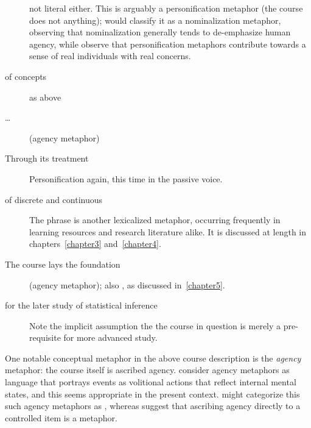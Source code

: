 \begin{description}
  not literal either.  This is arguably a personification metaphor
  (the course does not  anything);
   would classify it as a nominalization metaphor,
  observing that nominalization generally tends to de-emphasize human
  agency, while  observe that personification
  metaphors contribute towards a sense of real individuals with real
  concerns.
\item[of \metaphor{basic} concepts]\qquad as above
\item[\metaphor{the course studies}\ldots]\qquad (agency metaphor)
\item[Through its treatment]\qquad Personification again, this time in
  the passive voice.
\item[of discrete and continuous \metaphor{random variables}]\qquad
  The phrase  is another lexicalized
  metaphor, occurring frequently in learning resources and research
  literature alike.  It is discussed at length in
  chapters~\ref{chapter3} and~\ref{chapter4}.
\item[The course lays the foundation]\qquad (agency metaphor); also
  , as discussed in~\ref{chapter5}.
\item[for the later study of statistical inference]\qquad Note the
  implicit assumption the the course in question is merely a
  pre-requisite for more advanced study.
\end{description}

\noindent One notable conceptual metaphor in the above course
description is the \emph{agency} metaphor: the course itself is
ascribed agency.   consider agency metaphors as
language that portrays events as volitional actions that reflect
internal mental states, and this seems appropriate in the present
context.   might categorize this such agency
metaphors as , whereas
 suggest that ascribing agency directly to a
controlled item is a  metaphor.





